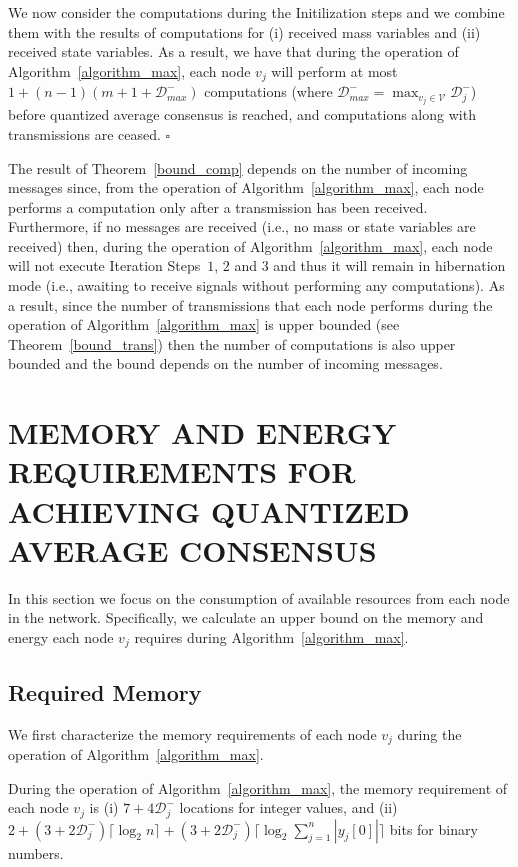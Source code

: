 \documentclass[twocolumn]{autart}    %
\begin{document}
\begin{pf}
We now consider the computations during the Initilization steps and we combine them with the results of computations for (i) received mass variables and (ii) received state variables. 
As a result, we have that during the operation of Algorithm~\ref{algorithm_max}, each node $v_j$ will perform at most $1 + (n-1) (m + 1 + \mathcal{D}_{max}^-)$ computations (where $\mathcal{D}_{max}^- = \max_{v_j \in \mathcal{V}} \mathcal{D}_j^-$) before quantized average consensus is reached, and computations along with transmissions are ceased. \hspace*{\fill} $\square$
\end{pf}


The result of Theorem~\ref{bound_comp} depends on the number of incoming messages since, from the operation of  Algorithm~\ref{algorithm_max}, each node performs a computation only after a transmission has been received. 
Furthermore, if no messages are received (i.e., no mass or state variables are received) then, during the operation of Algorithm~\ref{algorithm_max}, each node will not execute Iteration Steps~$1$, $2$ and $3$ and thus it will remain in hibernation mode (i.e., awaiting to receive signals without performing any computations). 
As a result, since the number of transmissions that each node performs during the operation of Algorithm~\ref{algorithm_max} is upper bounded (see Theorem~\ref{bound_trans}) then the number of computations is also upper bounded and the bound depends on the number of incoming messages. 



\section{MEMORY AND ENERGY REQUIREMENTS FOR ACHIEVING QUANTIZED AVERAGE CONSENSUS}\label{energy_constr}

In this section we focus on the consumption of available resources from each node in the network. 
Specifically, we calculate an upper bound on the memory and energy each node $v_j$ requires during Algorithm~\ref{algorithm_max}. 


\subsection{Required Memory}

We first characterize the memory requirements of each node $v_j$ during the operation of Algorithm~\ref{algorithm_max}. 


\begin{prop}\label{Memory_prop}
During the operation of Algorithm~\ref{algorithm_max}, the memory requirement of each node $v_j$ is (i) $7 + 4 \mathcal{D}_{j}^-$ locations for integer values, and (ii) $ 2 + (3 + 2\mathcal{D}_{j}^-) \lceil \log_{2} n \rceil + (3 + 2\mathcal{D}_{j}^-) \lceil \log_{2} \sum_{j=1}^n | y_j[0] | \rceil $ bits for binary numbers. 
\end{prop}
\end{document}
